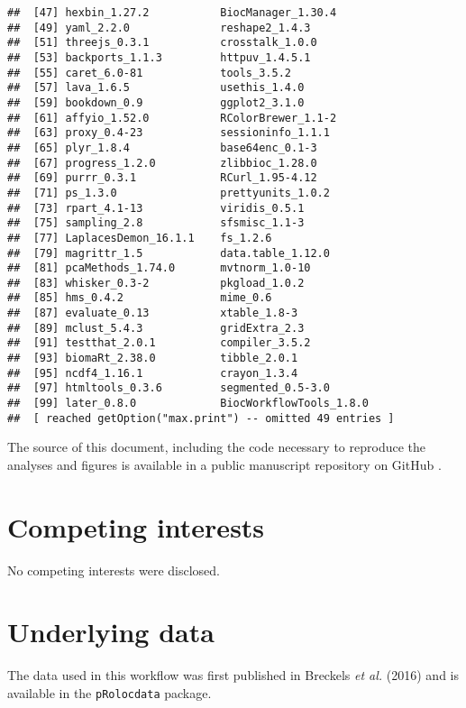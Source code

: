 \documentclass[9pt,a4paper,]{extarticle}
\begin{document}
\begin{verbatim}
##  [47] hexbin_1.27.2           BiocManager_1.30.4     
##  [49] yaml_2.2.0              reshape2_1.4.3         
##  [51] threejs_0.3.1           crosstalk_1.0.0        
##  [53] backports_1.1.3         httpuv_1.4.5.1         
##  [55] caret_6.0-81            tools_3.5.2            
##  [57] lava_1.6.5              usethis_1.4.0          
##  [59] bookdown_0.9            ggplot2_3.1.0          
##  [61] affyio_1.52.0           RColorBrewer_1.1-2     
##  [63] proxy_0.4-23            sessioninfo_1.1.1      
##  [65] plyr_1.8.4              base64enc_0.1-3        
##  [67] progress_1.2.0          zlibbioc_1.28.0        
##  [69] purrr_0.3.1             RCurl_1.95-4.12        
##  [71] ps_1.3.0                prettyunits_1.0.2      
##  [73] rpart_4.1-13            viridis_0.5.1          
##  [75] sampling_2.8            sfsmisc_1.1-3          
##  [77] LaplacesDemon_16.1.1    fs_1.2.6               
##  [79] magrittr_1.5            data.table_1.12.0      
##  [81] pcaMethods_1.74.0       mvtnorm_1.0-10         
##  [83] whisker_0.3-2           pkgload_1.0.2          
##  [85] hms_0.4.2               mime_0.6               
##  [87] evaluate_0.13           xtable_1.8-3           
##  [89] mclust_5.4.3            gridExtra_2.3          
##  [91] testthat_2.0.1          compiler_3.5.2         
##  [93] biomaRt_2.38.0          tibble_2.0.1           
##  [95] ncdf4_1.16.1            crayon_1.3.4           
##  [97] htmltools_0.3.6         segmented_0.5-3.0      
##  [99] later_0.8.0             BiocWorkflowTools_1.8.0
##  [ reached getOption("max.print") -- omitted 49 entries ]
\end{verbatim}

The source of this document, including the code necessary to reproduce
the analyses and figures is available in a public manuscript
repository on GitHub \citep{ghrepo}.

\hypertarget{competing-interests}{%
\section{Competing interests}\label{competing-interests}}

No competing interests were disclosed.

\hypertarget{underlying-data}{%
\section{Underlying data}\label{underlying-data}}

The data used in this workflow was first published in Breckels \emph{et
al.} (2016) \citep{Breckels:2016} and is available in the \texttt{pRolocdata}
package.
\end{document}
